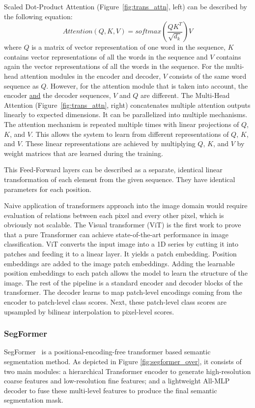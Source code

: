 Scaled Dot-Product Attention (Figure~\ref{fig:trans_attn}, left) can be described by the following equation:
\begin{equation} \label{eq:1}
Attention(Q,K,V) = softmax(\frac{QK^T}{\sqrt{d_k}})V
\end{equation}
where $Q$ is a matrix of vector representation of one word in the sequence, $K$ contains vector representations of all the words in the sequence and $V$ contains again the vector representations of all the words in the sequence. For the multi-head attention modules in the encoder and decoder, $V$ consists of the same word sequence as $Q$. However, for the attention module that is taken into account, the encoder \underline{and} the decoder sequences, $V$ and $Q$ are different. The Multi-Head Attention (Figure~\ref{fig:trans_attn}, right) concatenates multiple attention outputs linearly to expected dimensions. It can be parallelized into multiple mechanisms. The attention mechanism is repeated multiple times with linear projections of $Q$, $K$, and $V$. This allows the system to learn from different representations of $Q$, $K$, and $V$. These linear representations are achieved by multiplying $Q$, $K$, and $V$ by weight matrices that are learned during the training.

This Feed-Forward layers can be described as a separate, identical linear transformation of each element from the given sequence. They have identical parameters for each position.

Naive application of transformers approach into the image domain would require evaluation of relations between each pixel and every other pixel, which is obviously not scalable. The Visual transformer (ViT) \cite{dosovitskiy2020image} is the first work to prove that a pure Transformer can achieve state-of-the-art performance in image classification. ViT converts the input image into a 1D series by cutting it into patches and feeding it to a linear layer. It yields a patch embedding. Position embeddings are added to the image patch embeddings. Adding the learnable position embeddings to each patch allows the model to learn the structure of the image. The rest of the pipeline is a standard encoder and decoder blocks of the transformer.  The decoder learns to map patch-level encodings coming from the encoder to patch-level class scores. Next, these patch-level class scores are upsampled by bilinear interpolation to pixel-level scores.

\subsubsection{SegFormer}
SegFormer~\cite{xie2021segformer} is a positional-encoding-free transformer based semantic segmentation method. As depicted in Figure \ref{fig:segformer_over}, it consists of two main modules: a hierarchical Transformer encoder to generate high-resolution coarse features and low-resolution fine features; and a lightweight All-MLP decoder to fuse these multi-level features to produce the final semantic segmentation mask. 

